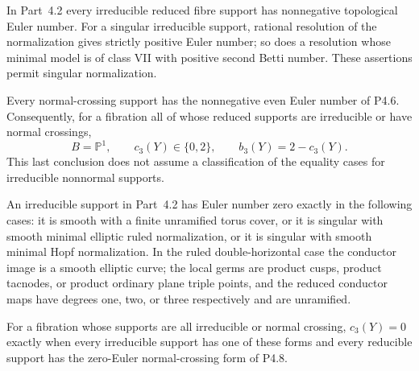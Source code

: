 
\begin{proposition}[P4.26]\hypertarget{tag-02WY}{}\label{night:P4.26}\label{stmt:P4.26}


In Part~4.2 every irreducible reduced fibre support
has nonnegative topological Euler number. For a
singular irreducible support, rational resolution
of the normalization gives strictly positive
Euler number; so does a resolution whose minimal
model is of class VII with positive second
Betti number. These assertions permit singular
normalization.

Every normal-crossing support has the
nonnegative even Euler number of P4.6.
Consequently, for a fibration all of whose
reduced supports are irreducible or have
normal crossings,
\[
 B=\mathbb P^1,\qquad c_3(Y)\in\{0,2\},
 \qquad b_3(Y)=2-c_3(Y).
\]
This last conclusion does not assume a
classification of the equality cases for
irreducible nonnormal supports.
\end{proposition}

\begin{proposition}[P4.32]\hypertarget{tag-02X5}{}\label{night:P4.32}\label{stmt:P4.32}


An irreducible support in Part~4.2 has Euler number zero exactly
in the following cases: it is smooth with a finite unramified
torus cover, or it is singular with smooth minimal elliptic ruled
normalization, or it is singular with smooth minimal Hopf
normalization. In the ruled double-horizontal case the conductor
image is a smooth elliptic curve; the local germs are product
cusps, product tacnodes, or product ordinary plane triple points,
and the reduced conductor maps have degrees one, two, or three
respectively and are unramified.

For a fibration whose supports are all irreducible or normal
crossing, $c_3(Y)=0$ exactly when every irreducible support has
one of these forms and every reducible support has the
zero-Euler normal-crossing form of P4.8.
\end{proposition}

